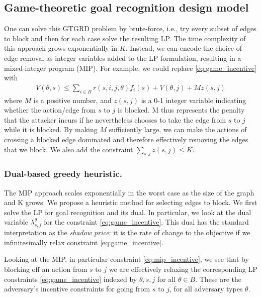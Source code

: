 \subsection{Game-theoretic goal recognition design model}
One can solve this GTGRD problem by brute-force, i.e., try every subset of edges to block and then for each case solve the resulting LP. The time complexity of this approach grows exponentially in $K$. 
Instead, we can encode the choice of edge removal as integer variables added to the LP formulation, resulting in a mixed-integer program (MIP). For example, we could replace
\eqref{eq:game_incentive} with
\begin{align}
V(\theta, s) \leq \sum_{i \in B} r(s, i, j, \theta)f_{i}(s) + V(\theta, j) + M z(s, j) 
\label{eq:mip_incentive}
\end{align}
where $M$ is a positive number, and 
$z(s, j)$ is a 0-1 integer variable indicating whether
the action/edge from $s$ to $j$ is blocked.
M thus represents the penalty that the attacker incurs if he nevertheless chooses to take the edge from $s$ to $j$ while it is blocked. By making $M$ sufficiently large, we can make the actions of crossing a blocked edge dominated and therefore effectively removing the edges that we block.
We also add the constraint $\sum_{s,j} z(s,j) \leq K $.


\subsubsection{Dual-based greedy heuristic.}
The MIP approach scales exponentially in the worst case as the size of the graph and K grows.
 We propose a heuristic method for selecting edges to block.
 We first solve the LP for goal recognition and its dual.
In particular, we look at the dual variable 
$\lambda^\theta_{s,j}$ for the constraint \eqref{eq:game_incentive}.
 This dual has the standard interpretation as the \emph{shadow price}:
it is the rate of change to the objective if we infinitesimally relax
constraint \eqref{eq:game_incentive}.

 Looking at the MIP, in particular constraint \eqref{eq:mip_incentive}, we see that by blocking off an action from $s$ to $j$ we are effectively relaxing the corresponding LP constraints \eqref{eq:game_incentive} 
indexed by $\theta,s,j$ for all $\theta\in B$.
These are the adversary's incentive constraints for going from $s$ to $j$, for all adversary types $\theta$.


